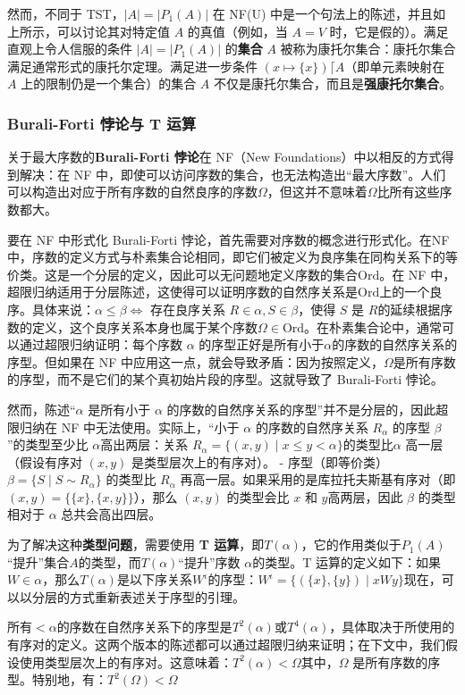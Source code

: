 然而，不同于 TST，\( |A| = |P_1(A)| \) 在 NF(U) 中是一个句法上的陈述，并且如上所示，可以讨论其对特定值 \( A \) 的真值（例如，当 \( A = V \) 时，它是假的）。满足直观上令人信服的条件 \( |A| = |P_1(A)| \) 的\textbf{集合} \( A \) 被称为康托尔集合：康托尔集合满足通常形式的康托尔定理。满足进一步条件 \((x \mapsto \{x\}) \lceil A\)（即单元素映射在 \( A \) 上的限制仍是一个集合）的集合 \( A \) 不仅是康托尔集合，而且是\textbf{强康托尔集合}。
\subsubsection{Burali-Forti 悖论与 T 运算 } 
关于最大序数的\textbf{Burali-Forti 悖论}在 NF（New Foundations）中以相反的方式得到解决：在 NF 中，即使可以访问序数的集合，也无法构造出“最大序数”。人们可以构造出对应于所有序数的自然良序的序数\( \Omega \)，但这并不意味着\(\Omega \)比所有这些序数都大。

要在 NF 中形式化 Burali-Forti 悖论，首先需要对序数的概念进行形式化。在NF中，序数的定义方式与朴素集合论相同，即它们被定义为良序集在同构关系下的等价类。这是一个分层的定义，因此可以无问题地定义序数的集合\( \mathrm{Ord} \)。在 NF 中，超限归纳适用于分层陈述，这使得可以证明序数的自然序关系是\( \mathrm{Ord} \)上的一个良序。具体来说：\(\alpha \leq \beta \iff \text{ 存在良序关系 } R \in \alpha, S \in \beta \text{，使得 } S \text{ 是 } R \text{的延续}\)根据序数的定义，这个良序关系本身也属于某个序数\(\Omega \in \mathrm{Ord}\)。在朴素集合论中，通常可以通过超限归纳证明：每个序数 \( \alpha \) 的序型正好是所有小于\( \alpha \)的序数的自然序关系的序型。但如果在 NF 中应用这一点，就会导致矛盾：因为按照定义，\( \Omega \)是所有序数的序型，而不是它们的某个真初始片段的序型。这就导致了 Burali-Forti 悖论。

然而，陈述“\( \alpha \) 是所有小于 \( \alpha \) 的序数的自然序关系的序型”并不是分层的，因此超限归纳在 NF 中无法使用。实际上，“小于 \( \alpha \) 的序数的自然序关系 \( R_{\alpha} \) 的序型 \( \beta \)”的类型至少比 \( \alpha \)高出两层：关系 \( R_{\alpha} = \{(x, y) \mid x \leq y < \alpha\} \)的类型比\( \alpha \) 高一层（假设有序对 \( (x, y) \) 是类型层次上的有序对）。
- 序型（即等价类）\( \beta = \{S \mid S \sim R_{\alpha}\} \) 的类型比 \( R_{\alpha} \) 再高一层。如果采用的是库拉托夫斯基有序对（即 \( (x, y) = \{\{x\}, \{x, y\}\} \)），那么 \( (x, y) \) 的类型会比 \( x \) 和 \( y \)高两层，因此 \( \beta \) 的类型相对于 \( \alpha \) 总共会高出四层。

为了解决这种\textbf{类型问题}，需要使用 \textbf{T 运算}，即\( T(\alpha)\)，它的作用类似于\( P_1(A) \)“提升”集合\( A \)的类型，而\( T(\alpha)\)“提升”序数 \( \alpha\)的类型。T 运算的定义如下：如果\( W \in \alpha \)，那么\( T(\alpha)\)是以下序关系\(W^{\iota}\)的序型：\(W^{\iota} = \{(\{x\}, \{y\}) \mid x W y\}\)现在，可以以分层的方式重新表述关于序型的引理。

所有\(<\alpha \)的序数在自然序关系下的序型是\( T^2(\alpha) \)或\( T^4(\alpha) \)，具体取决于所使用的有序对的定义。这两个版本的陈述都可以通过超限归纳来证明；在下文中，我们假设使用类型层次上的有序对。这意味着：\(T^2(\alpha) < \Omega\)其中，\( \Omega \) 是所有序数的序型。特别地，有：\(T^2(\Omega) < \Omega\)